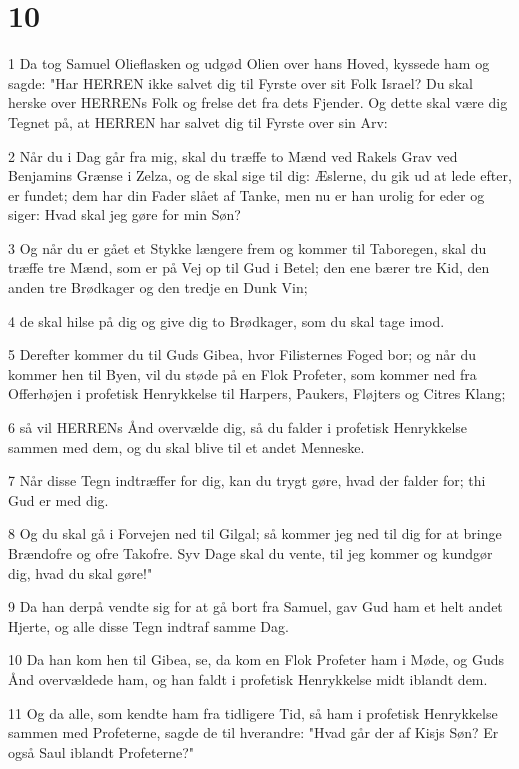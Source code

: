 \chapter{10}

\par 1 Da tog Samuel Olieflasken og udgød Olien over hans Hoved, kyssede ham og sagde: "Har HERREN ikke salvet dig til Fyrste over sit Folk Israel? Du skal herske over HERRENs Folk og frelse det fra dets Fjender. Og dette skal være dig Tegnet på, at HERREN har salvet dig til Fyrste over sin Arv:
\par 2 Når du i Dag går fra mig, skal du træffe to Mænd ved Rakels Grav ved Benjamins Grænse i Zelza, og de skal sige til dig: Æslerne, du gik ud at lede efter, er fundet; dem har din Fader slået af Tanke, men nu er han urolig for eder og siger: Hvad skal jeg gøre for min Søn?
\par 3 Og når du er gået et Stykke længere frem og kommer til Taboregen, skal du træffe tre Mænd, som er på Vej op til Gud i Betel; den ene bærer tre Kid, den anden tre Brødkager og den tredje en Dunk Vin;
\par 4 de skal hilse på dig og give dig to Brødkager, som du skal tage imod.
\par 5 Derefter kommer du til Guds Gibea, hvor Filisternes Foged bor; og når du kommer hen til Byen, vil du støde på en Flok Profeter, som kommer ned fra Offerhøjen i profetisk Henrykkelse til Harpers, Paukers, Fløjters og Citres Klang;
\par 6 så vil HERRENs Ånd overvælde dig, så du falder i profetisk Henrykkelse sammen med dem, og du skal blive til et andet Menneske.
\par 7 Når disse Tegn indtræffer for dig, kan du trygt gøre, hvad der falder for; thi Gud er med dig.
\par 8 Og du skal gå i Forvejen ned til Gilgal; så kommer jeg ned til dig for at bringe Brændofre og ofre Takofre. Syv Dage skal du vente, til jeg kommer og kundgør dig, hvad du skal gøre!"
\par 9 Da han derpå vendte sig for at gå bort fra Samuel, gav Gud ham et helt andet Hjerte, og alle disse Tegn indtraf samme Dag.
\par 10 Da han kom hen til Gibea, se, da kom en Flok Profeter ham i Møde, og Guds Ånd overvældede ham, og han faldt i profetisk Henrykkelse midt iblandt dem.
\par 11 Og da alle, som kendte ham fra tidligere Tid, så ham i profetisk Henrykkelse sammen med Profeterne, sagde de til hverandre: "Hvad går der af Kisjs Søn? Er også Saul iblandt Profeterne?"
